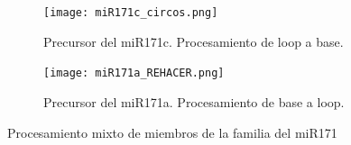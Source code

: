 \begin{landscape}
	\begin{figure}
	\centering
	\begin{subfigure}{.75\textwidth}
	  \centering
	  \texttt{[image: miR171c\_circos.png]}
	  \caption{Precursor del miR171c. Procesamiento de loop a base. }
	  \label{subfig:miR171c_circos}
	\end{subfigure}%
	\begin{subfigure}{.75\textwidth}
	  \centering
	  \texttt{[image: miR171a\_REHACER.png]}
	  \caption{Precursor del miR171a. Procesamiento de base a loop.}
	  \label{subfig:miR171a_circos}
	\end{subfigure}
	\caption{Procesamiento mixto de miembros de la familia del miR171}
	\label{fig:familia_miR171_circos}
	\end{figure}
\end{landscape}



